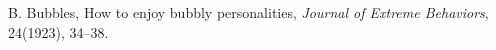 
\begin{thebibliography}{9999}
  B. Bubbles, How to enjoy bubbly personalities, \emph{Journal of
    Extreme Behaviors}, 24(1923), 34--38.
\end{thebibliography}
